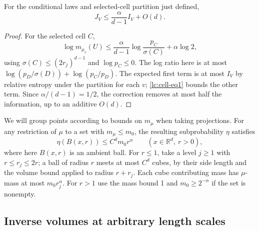 \begin{lemma}\label{lc:cell-coercivity}
For the conditional laws and selected-cell partition just defined,
\begin{equation}\label{lc:cell-eq2}
J_V \le \frac{\alpha}{d-1} I_V + O(d).
\end{equation}
\end{lemma}
\begin{proof}
For the selected cell \(C\),
\[
 \log m_{\mu_v}(U)
 \le \frac{\alpha}{d-1}\log\frac{p_C}{\sigma(C)}+\alpha\log 2,
\]
using \(\sigma(C)\le (2r_j)^{d-1}\) and \(\log p_C\le 0\). The log ratio here is at most \(\log(p_D/\sigma(D))+\log(p_C/p_D)\). The expected first term is at most \(I_V\) by relative entropy under the partition for each \(v\); \eqref{lc:cell-eq1} bounds the other term. Since \(\alpha/(d-1)=1/2\), the correction removes at most half the information, up to an additive \(O(d)\).
\end{proof}

We will group points according to bounds on \(m_\mu\) when taking projections. For any restriction of \(\mu\) to a set with \(m_\mu\le m_0\), the resulting subprobability \(\eta\) satisfies
\begin{equation}\label{lc:cell-eq3}
\eta(B(x,r))\le C^d m_0 r^\alpha\qquad (x\in\mathbb R^d,\ r>0),
\end{equation}
where here \(B(x,r)\) is an ambient ball. For \(r\le 1\), take a level \(j\ge 1\) with \(r\le r_j\le 2r\); a ball of radius \(r\) meets at most \(C^d\) cubes, by their side length and the volume bound applied to radius \(r+r_j\). Each cube contributing mass has \(\mu\)-mass at most \(m_0 r_j^\alpha\). For \(r>1\) use the mass bound 1 and \(m_0\ge 2^{-\alpha}\) if the set is nonempty.

\subsection{Inverse volumes at arbitrary length scales}\label{lc:cell-inverse-section}

